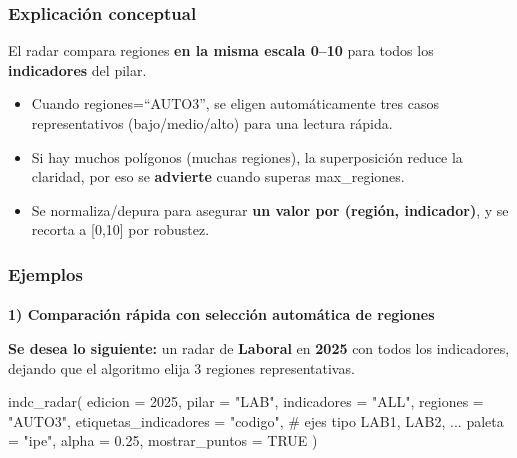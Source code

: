 \documentclass[
  11pt,
  letterpaper,
  DIV=11,
  numbers=noendperiod]{scrartcl}
\makeatletter
\let\oldparagraph\paragraph
\renewcommand{\paragraph}{
    \@ifstar
      \xxxParagraphStar
      \xxxParagraphNoStar
  }
\newcommand{\xxxParagraphStar}[1]{\oldparagraph*{#1}\mbox{}}
\newcommand{\xxxParagraphNoStar}[1]{\oldparagraph{#1}\mbox{}}
\newenvironment{Shaded}{\begin{snugshade}}{\end{snugshade}}
\newcommand{\AttributeTok}[1]{\textcolor[rgb]{0.40,0.45,0.13}{#1}}
\newcommand{\CommentTok}[1]{\textcolor[rgb]{0.37,0.37,0.37}{#1}}
\newcommand{\ConstantTok}[1]{\textcolor[rgb]{0.56,0.35,0.01}{#1}}
\newcommand{\DecValTok}[1]{\textcolor[rgb]{0.68,0.00,0.00}{#1}}
\newcommand{\FloatTok}[1]{\textcolor[rgb]{0.68,0.00,0.00}{#1}}
\newcommand{\FunctionTok}[1]{\textcolor[rgb]{0.28,0.35,0.67}{#1}}
\newcommand{\NormalTok}[1]{\textcolor[rgb]{0.00,0.23,0.31}{#1}}
\newcommand{\StringTok}[1]{\textcolor[rgb]{0.13,0.47,0.30}{#1}}
\makeatother
\begin{document}
\subsubsection{\texorpdfstring{\textbf{Explicación
conceptual}}{Explicación conceptual}}\label{explicaciuxf3n-conceptual-16}

El radar compara regiones \textbf{en la misma escala 0--10} para todos
los \textbf{indicadores} del pilar.

\begin{itemize}
\item
  Cuando regiones=``AUTO3'', se eligen automáticamente tres casos
  representativos (bajo/medio/alto) para una lectura rápida.
\item
  Si hay muchos polígonos (muchas regiones), la superposición reduce la
  claridad, por eso se \textbf{advierte} cuando superas max\_regiones.
\item
  Se normaliza/depura para asegurar \textbf{un valor por (región,
  indicador)}, y se recorta a {[}0,10{]} por robustez.
\end{itemize}

\subsubsection{\texorpdfstring{\textbf{Ejemplos}}{Ejemplos}}\label{ejemplos-16}

\paragraph{\texorpdfstring{\textbf{1) Comparación rápida con selección
automática de
regiones}}{1) Comparación rápida con selección automática de regiones}}\label{comparaciuxf3n-ruxe1pida-con-selecciuxf3n-automuxe1tica-de-regiones}

\textbf{Se desea lo siguiente:} un radar de \textbf{Laboral} en
\textbf{2025} con todos los indicadores, dejando que el algoritmo elija
3 regiones representativas.

\begin{Shaded}
\begin{Highlighting}[]
\FunctionTok{indc\_radar}\NormalTok{(}
  \AttributeTok{edicion   =} \DecValTok{2025}\NormalTok{,}
  \AttributeTok{pilar     =} \StringTok{"LAB"}\NormalTok{,}
  \AttributeTok{indicadores =} \StringTok{"ALL"}\NormalTok{,}
  \AttributeTok{regiones  =} \StringTok{"AUTO3"}\NormalTok{,}
  \AttributeTok{etiquetas\_indicadores =} \StringTok{"codigo"}\NormalTok{,  }\CommentTok{\# ejes tipo LAB1, LAB2, ...}
  \AttributeTok{paleta    =} \StringTok{"ipe"}\NormalTok{,}
  \AttributeTok{alpha     =} \FloatTok{0.25}\NormalTok{,}
  \AttributeTok{mostrar\_puntos =} \ConstantTok{TRUE}
\NormalTok{)}
\end{Highlighting}
\end{Shaded}
\end{document}
